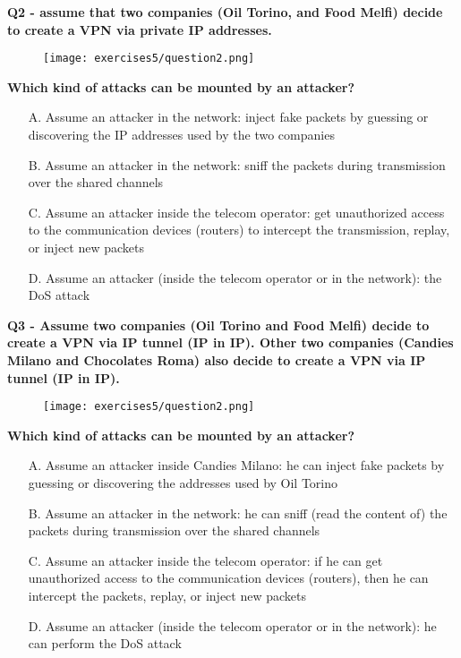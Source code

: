 \textbf{Q2 - assume that two companies (Oil Torino, and Food Melfi)
decide to create a VPN via private IP addresses.}
\begin{figure}[h]
    \centering
    \texttt{[image: exercises5/question2.png]}
\end{figure}
\textbf{Which kind of attacks can be mounted by an attacker?}
\begin{itemize}
    \item[A.] Assume an attacker in the network: inject fake packets by guessing or discovering the IP addresses used by the two companies
    \item[B.] Assume an attacker in the network: sniff the packets during transmission over the shared channels
    \item[C.] Assume an attacker inside the telecom operator: get unauthorized access to the communication devices (routers) to intercept the transmission, replay, or inject new packets
    \item[D.] Assume an attacker (inside the telecom operator or in the network): the DoS attack
\end{itemize}

\textbf{Q3 - Assume two companies (Oil Torino and Food Melfi) decide to create a VPN via IP tunnel (IP in IP).
Other two companies (Candies Milano and Chocolates Roma) also decide to create a VPN via IP tunnel (IP in IP).}
\begin{figure}[h]
    \centering
    \texttt{[image: exercises5/question2.png]}
\end{figure}
\textbf{Which kind of attacks can be mounted by an attacker?}
\begin{itemize}
    \item[A.] Assume an attacker inside Candies Milano: he can inject fake packets by guessing or discovering the addresses used by Oil Torino
    \item[B.] Assume an attacker in the network: he can sniff (read the content of) the packets during transmission over the shared channels
    \item[C.] Assume an attacker inside the telecom operator: if he can get unauthorized access to the communication devices (routers), then he can intercept the packets, replay, or inject new packets
    \item[D.] Assume an attacker (inside the telecom operator or in the network): he can perform the DoS attack
\end{itemize}

